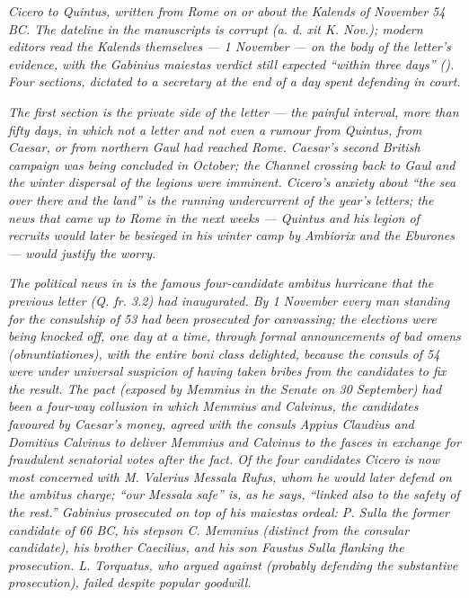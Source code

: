 
\textit{Cicero to Quintus, written from Rome on or about the
Kalends of November 54 BC. The dateline in the manuscripts is
corrupt (\textit{a. d. xit K. Nov.}); modern editors read the
Kalends themselves --- 1 November --- on the body of the
letter's evidence, with the Gabinius \textit{maiestas} verdict
still expected ``within three days'' (). Four
sections, dictated to a secretary at the end of a day spent
defending in court.}

\textit{The first section is the private side of the letter
--- the painful interval, more than fifty days, in which not
a letter and not even a rumour from Quintus, from Caesar, or
from northern Gaul had reached Rome. Caesar's second British
campaign was being concluded in October; the Channel crossing
back to Gaul and the winter dispersal of the legions were
imminent. Cicero's anxiety about ``the sea over there and the
land'' is the running undercurrent of the year's letters; the
news that came up to Rome in the next weeks --- Quintus and
his legion of recruits would later be besieged in his winter
camp by Ambiorix and the Eburones --- would justify the
worry.}

\textit{The political news in  is the famous
four-candidate ambitus hurricane that the previous letter
(Q. fr. 3.2) had inaugurated. By 1 November every man
standing for the consulship of 53 had been prosecuted for
canvassing; the elections were being knocked off, one day at
a time, through formal announcements of bad omens
(\textit{obnuntiationes}), with the entire \textit{boni}
class delighted, because the consuls of 54 were under
universal suspicion of having taken bribes from the
candidates to fix the result. The pact (exposed by Memmius
in the Senate on 30 September) had been a four-way collusion
in which Memmius and Calvinus, the candidates favoured by
Caesar's money, agreed with the consuls Appius Claudius and
Domitius Calvinus to deliver Memmius and Calvinus to the
fasces in exchange for fraudulent senatorial votes after the
fact. Of the four candidates Cicero is now most concerned
with M. Valerius Messala Rufus, whom he would later defend
on the ambitus charge; ``our Messala safe'' is, as he says,
``linked also to the safety of the rest.'' Gabinius
prosecuted on top of his \textit{maiestas} ordeal: P. Sulla
the former candidate of 66 BC, his stepson C. Memmius
(distinct from the consular candidate), his brother Caecilius,
and his son Faustus Sulla flanking the prosecution. L.
Torquatus, who argued against (probably defending the
substantive prosecution), failed despite popular goodwill.}

